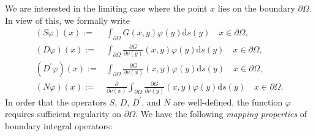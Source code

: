 \documentclass{article}
\theoremstyle{plain}
\theoremstyle{definition}
\begin{document}
We are interested in the limiting case where the point $x$ lies on the boundary $\partial\Omega$. In view of this, we formally write
\begin{align*}
    (S\varphi)(x) :=& \int_{\partial\Omega} G(x,y)\varphi(y) \mathrm ds(y) \quad x\in\partial\Omega,
\\
    (D\varphi)(x) :=& \int_{\partial\Omega} \frac{\partial G}{\partial \nu(y)}(x,y)\varphi(y) \mathrm ds(y) \quad x\in\partial\Omega,
\\
    (D^\prime \varphi)(x) :=& \int_{\partial\Omega} \frac{\partial G}{\partial \nu(x)}(x,y)\varphi(y) \mathrm ds(y) \quad x\in\partial\Omega,
\\
    (N\varphi)(x) :=& \frac{\partial}{\partial\nu(x)} \int_{\partial\Omega} \frac{\partial G}{\partial \nu(y)}(x,y)\varphi(y) \mathrm ds(y) \quad x\in\partial\Omega.
\end{align*}
In order that the operators $S$, $D$, $D^\prime$, and $N$ are well-defined, the function $\varphi$ requires sufficient regularity on $\partial\Omega$. We have the following \textit{mapping properties} of boundary integral operators:
\end{document}
